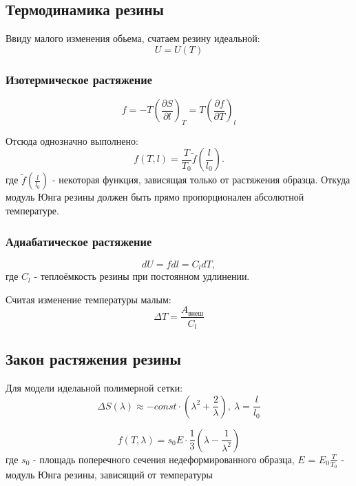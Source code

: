 \documentclass[a4paper,12pt]{article} %
\begin{document}
\subsection*{Термодинамика резины}

Ввиду малого изменения обьема, счатаем резину идеальной:
\begin{equation}
U = U(T)
\end{equation}

\subsubsection*{\centering Изотермическое растяжение}
\begin{equation}
f = -T(\frac{\partial S}{\partial l})_T = T(\frac{\partial f}{\partial T})_l
\end{equation}

Отсюда однозначно выполнено:
\begin{equation}
f(T, l) = \frac{T}{T_0}\tilde{f}({\frac{l}{l_0}}).
\end{equation}
где $\tilde{f}({\frac{l}{l_0}})$ - некоторая функция, зависящая только от растяжения образца. Откуда модуль Юнга резины должен быть прямо пропорционален абсолютной температуре.

\subsubsection*{\centering Адиабатическое растяжение}

\begin{equation}
dU= fdl = C_ldT,
\end{equation}
где $C_l$ - теплоёмкость резины при постоянном удлинении.

Считая изменение температуры малым:
\begin{equation}
\Delta T = \frac{A_{внеш}}{C_l}
\end{equation}

\subsection*{Закон растяжения резины}

Для модели иделаьной полимерной сетки:
\begin{equation}
\Delta S(\lambda) \approx -const \cdot (\lambda^2+\frac{2}{\lambda}), \ \lambda = \frac{l}{l_0}
\end{equation}

\begin{equation}
f(T, \lambda) = s_0E\cdot \frac{1}{3}(\lambda-\frac{1}{\lambda^2})
\end{equation}
где $s_0$ - площадь поперечного сечения недеформированного образца, $E$ = $E_0 \frac{T}{T_0}$ - модуль Юнга резины, зависящий от температуры
\end{document}
